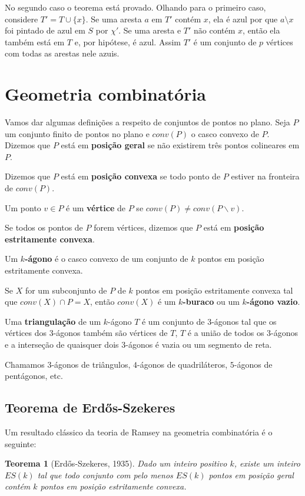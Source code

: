 \documentclass[a4paper]{book}
\newtheorem{teorema}{Teorema}
\begin{document}
No segundo caso o teorema está provado. Olhando para o primeiro caso, considere $T'=T\cup\{x\}$. Se uma aresta $a$ em $T'$ contém $x$, ela é azul por que $a\setminus x$ foi pintado de azul em $S$ por $\chi'$. Se uma aresta e $T'$ não contém $x$, então ela também está em $T$ e, por hipótese, é azul. Assim $T'$ é um conjunto de $p$ vértices com todas as arestas nele azuis.

\section{Geometria combinatória}
Vamos dar algumas definições a respeito de conjuntos de pontos no plano. Seja $P$ um conjunto finito de pontos no plano e $conv(P)$ o casco convexo de $P$. Dizemos que $P$ está em \textbf{posição geral} se não existirem três pontos colineares em $P$. 

Dizemos que $P$ está em \textbf{posição convexa} se todo ponto de $P$ estiver na fronteira de $conv(P)$.

Um ponto $v\in P$ é um \textbf{vértice} de $P$ se $conv(P)\neq conv(P\backslash v)$.

Se todos os pontos de $P$ forem vértices, dizemos que $P$ está em \textbf{posição estritamente convexa}.

Um \textbf{$k$-ágono} é o casco convexo de um conjunto de $k$ pontos em posição estritamente convexa.

Se $X$ for um subconjunto de $P$ de $k$ pontos em posição estritamente convexa tal que $conv(X)\cap P=X$, então  $conv(X)$ é um \textbf{$k$-buraco} ou um \textbf{$k$-ágono vazio}.

Uma \textbf{triangulação} de um $k$-ágono $T$ é um conjunto de $3$-ágonos tal que os vértices dos $3$-ágonos também são vértices de $T$, $T$ é a união de todos os $3$-ágonos e a interseção de quaisquer dois $3$-ágonos é vazia ou um segmento de reta.

Chamamos $3$-ágonos de triângulos, $4$-ágonos de quadriláteros, $5$-ágonos de pentágonos, etc.

\subsection{Teorema de Erd\H os-Szekeres}
Um resultado clássico da teoria de Ramsey na geometria combinatória é o seguinte:
\begin{teorema}[Erd\H os-Szekeres, 1935]
    Dado um inteiro positivo $k$, existe um inteiro $ES(k)$ tal que todo conjunto com pelo menos $ES(k)$ pontos em posição geral contém $k$ pontos em posição estritamente convexa.
\end{teorema}
\end{document}
